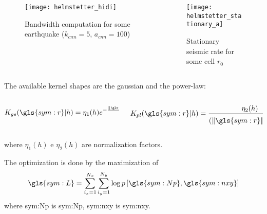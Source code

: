 \documentclass[final]{beamer}
\begin{document}
\begin{poster}
\begin{columns}
	\begin{column}[T]{0.48\textwidth}
		\begin{figure}[H]
		  \centering
		  \texttt{[image: helmstetter\_hidi]} 
		  \caption{Bandwidth computation for some earthquake ($k_{cnn} = 5$, $a_{cnn}
		  = 100$)}
		  \label{fig:h_hidi} 
		\end{figure}
	\end{column}

	\begin{column}[T]{0.51\textwidth}
		\begin{figure}[H]
		  \centering
		  \texttt{[image: helmstetter\_stationary\_a]} 
		  \caption{Stationary seismic rate for some cell $r_0$}
		  \label{fig:h_stationary} 
		\end{figure}
	\end{column}
\end{columns}


\footnotesize
The available kernel shapes are the gaussian and the power-law:
\begin{columns}
	\begin{column}[T]{0.49\textwidth}
		\footnotesize
		\begin{equation}
			\ensuremath{
				K_{gs}(\gls{sym:r}\arrowvert h) = \eta_1(h)
					e^{- \frac{\|\gls{sym:r}\|^2}
		 				 	  {2 h^2 }},
		 	}
		\label{eq:kernel_gs}
		\end{equation}
	\end{column}

	\begin{column}[T]{0.49\textwidth}
		\footnotesize
		\begin{equation}
			\ensuremath{
				K_{pl}(\gls{sym:r}\arrowvert h) = 
					\frac{\eta_2(h)}
		 				 {\left( \|\gls{sym:r}\|^2 + h^2 \right)^{\frac{3}{2}} },
		 	}
		\label{eq:kernel_pl}
		\end{equation}
	\end{column}
\end{columns}
\footnotesize
where $\eta_1(h)$ e $\eta_2(h)$ are normalization factors.

\newcolumn

\footnotesize
The optimization is done by the maximization of 
\small
		\begin{equation}
			\ensuremath{
				\gls{sym:L} = \sum_{i_x=1}^{N_x}\sum_{i_y=1}^{N_y}\log p\left[  \gls{sym:Np}, \gls{sym:nxy}  \right]}
			\label{eq:loglik}
		\end{equation}
\footnotesize
	where \gls{sym:Np} is \glsdesc{sym:Np},
		\gls{sym:nxy} is \glsdesc{sym:nxy}.


\end{poster}
\end{document}
